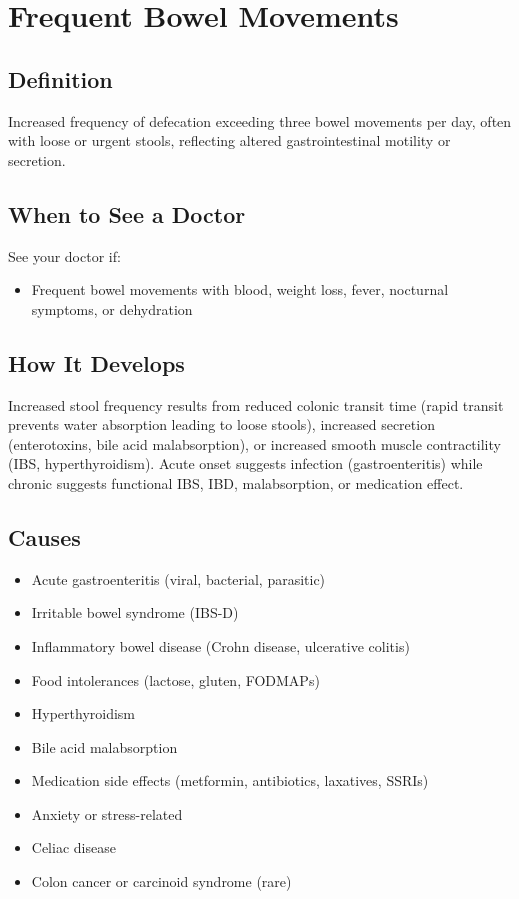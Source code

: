 \chapter{Frequent Bowel Movements}

\section*{Definition}
Increased frequency of defecation exceeding three bowel movements per day, often with loose or urgent stools, reflecting altered gastrointestinal motility or secretion.

\section*{When to See a Doctor}
See your doctor if:
\begin{itemize}
  \item Frequent bowel movements with blood, weight loss, fever, nocturnal symptoms, or dehydration
\end{itemize}

\section*{How It Develops}
Increased stool frequency results from reduced colonic transit time (rapid transit prevents water absorption leading to loose stools), increased secretion (enterotoxins, bile acid malabsorption), or increased smooth muscle contractility (IBS, hyperthyroidism). Acute onset suggests infection (gastroenteritis) while chronic suggests functional IBS, IBD, malabsorption, or medication effect.

\section*{Causes}
\begin{itemize}
  \item Acute gastroenteritis (viral, bacterial, parasitic)
  \item Irritable bowel syndrome (IBS-D)
  \item Inflammatory bowel disease (Crohn disease, ulcerative colitis)
  \item Food intolerances (lactose, gluten, FODMAPs)
  \item Hyperthyroidism
  \item Bile acid malabsorption
  \item Medication side effects (metformin, antibiotics, laxatives, SSRIs)
  \item Anxiety or stress-related
  \item Celiac disease
  \item Colon cancer or carcinoid syndrome (rare)
\end{itemize}

